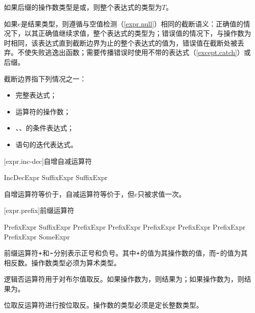 \pnum
如果后缀\tcode{!}的操作数类型是或，则整个表达式的类型为$T$。

\pnum
如果$e$是结果类型，则遵循与空值检测（\ref{expr.null}）相同的截断语义：正确值的情况下，以其正确值继续求值，整个表达式的类型为；错误值的情况下，与操作数为时相同，该表达式直到截断边界为止的整个表达式的值为，错误值在截断处被丢弃。\enternote {}不使失败逃逸出函数；需要传播错误时使用不带的表达式（\ref{except.catch}）或后缀\tcode{!}。 \exitnote

\pnum
截断边界指下列情况之一：

\begin{itemize}
    \item 完整表达式；
    \item {}运算符的操作数；
    \item {}、、的条件表达式；
    \item {}语句的迭代表达式。
\end{itemize}

[expr.inc-dec]{自增自减运算符}

\begin{bnf}{IncDecExpr}
    SuffixExpr \terminal{++} \br
    SuffixExpr \terminal{--}
\end{bnf}

\pnum
自增运算符等价于，自减运算符等价于，但$e$只被求值一次。

[expr.prefix]{前缀运算符}

\begin{bnf}{PrefixExpr}
    SuffixExpr \br
    \terminal{+} PrefixExpr \br
    \terminal{-} PrefixExpr \br
    \terminal{!} PrefixExpr \br
     PrefixExpr \br
    \terminal{\&} \bnfq PrefixExpr \br
    \terminal{*} PrefixExpr \br
    SomeExpr
\end{bnf}

\pnum
前缀运算符$\mathbin{\texttt{+}}$和$\mathbin{\texttt{-}}$分别表示正号和负号。其中$\mathbin{\texttt{+}}$的值为其操作数的值，而$\mathbin{\texttt{-}}$的值为其相反数。操作数类型必须为算术类型。

\pnum
逻辑否运算符\tcode{!}用于对布尔值取反。如果操作数为，则结果为；如果操作数为，则结果为。

\pnum
位取反运算符进行按位取反。操作数的类型必须是定长整数类型。

